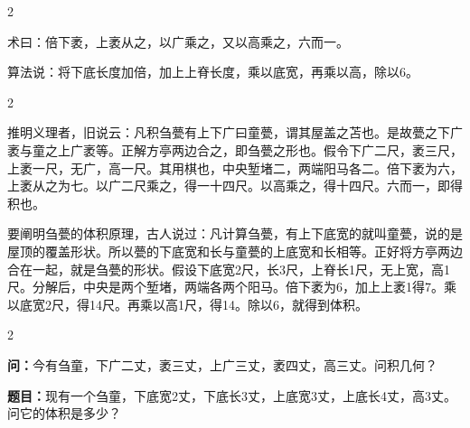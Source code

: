 \documentclass[11pt,a4paper]{article}
\begin{document}
\vspace{0.2cm}

\begin{paracol}{2}

\begin{methodbox}[\CJKfamily{rm}术 · 原文]
术曰：倍下袤，上袤从之，以广乘之，又以高乘之，六而一。
\end{methodbox}

\switchcolumn

\begin{methodbox}
算法说：将下底长度加倍，加上上脊长度，乘以底宽，再乘以高，除以6。
\end{methodbox}

\end{paracol}

\vspace{0.2cm}

\begin{paracol}{2}

\begin{commentarybox}
推明义理者，旧说云：凡积刍甍有上下广曰童甍，谓其屋盖之苫也。是故甍之下广袤与童之上广袤等。正解方亭两边合之，即刍甍之形也。假令下广二尺，袤三尺，上袤一尺，无广，高一尺。其用棋也，中央堑堵二，两端阳马各二。倍下袤为六，上袤从之为七。以广二尺乘之，得一十四尺。以高乘之，得十四尺。六而一，即得积也。
\end{commentarybox}

\switchcolumn

\begin{commentarybox}
要阐明刍甍的体积原理，古人说过：凡计算刍甍，有上下底宽的就叫童甍，说的是屋顶的覆盖形状。所以甍的下底宽和长与童甍的上底宽和长相等。正好将方亭两边合在一起，就是刍甍的形状。假设下底宽2尺，长3尺，上脊长1尺，无上宽，高1尺。分解后，中央是两个堑堵，两端各两个阳马。倍下袤为6，加上上袤1得7。乘以底宽2尺，得14尺。再乘以高1尺，得14。除以6，就得到体积。
\end{commentarybox}

\end{paracol}

\vspace{0.3cm}

\begin{paracol}{2}

\begin{problembox}[\CJKfamily{rm}刍童 · 原文]
\textbf{问：}今有刍童，下广二丈，袤三丈，上广三丈，袤四丈，高三丈。问积几何？
\end{problembox}

\switchcolumn

\begin{problembox}
\textbf{题目：}现有一个刍童，下底宽2丈，下底长3丈，上底宽3丈，上底长4丈，高3丈。问它的体积是多少？
\end{problembox}

\end{paracol}
\end{document}
